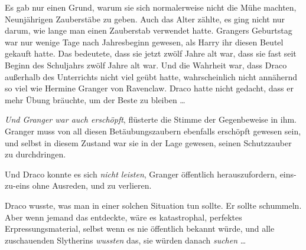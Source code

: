 Es gab nur einen Grund, warum sie sich normalerweise nicht die Mühe machten, Neunjährigen Zauberstäbe zu geben. Auch das Alter zählte, es ging nicht nur darum, wie lange man einen Zauberstab verwendet hatte. Grangers Geburtstag war nur wenige Tage nach Jahresbeginn gewesen, als Harry ihr diesen Beutel gekauft hatte. Das bedeutete, dass sie jetzt zwölf Jahre alt war, dass sie fast seit Beginn des Schuljahrs zwölf Jahre alt war. Und die Wahrheit war, dass Draco außerhalb des Unterrichts nicht viel geübt hatte, wahrscheinlich nicht annähernd so viel wie Hermine Granger von Ravenclaw. Draco hatte nicht gedacht, dass er mehr Übung bräuchte, um der Beste zu bleiben …

\emph{Und Granger war auch erschöpft}, flüsterte die Stimme der Gegenbeweise in ihm. Granger muss von all diesen Betäubungszaubern ebenfalls erschöpft gewesen sein, und selbst in diesem Zustand war sie in der Lage gewesen, seinen Schutzzauber zu durchdringen.

Und Draco konnte es sich \emph{nicht leisten}, Granger öffentlich herauszufordern, eins-zu-eins ohne Ausreden, und zu verlieren.

Draco wusste, was man in einer solchen Situation tun sollte. Er sollte schummeln. Aber wenn jemand das entdeckte, wäre es katastrophal, perfektes Erpressungsmaterial, selbst wenn es nie öffentlich bekannt würde, und alle zuschauenden Slytherins \emph{wussten} das, sie würden danach \emph{suchen} …

